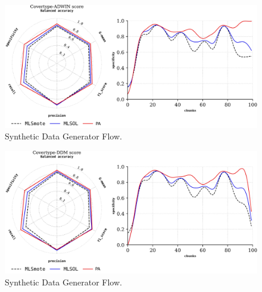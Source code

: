 \begin{figure}[!ht]
	\centering
	\includegraphics[width=1\linewidth]{4_Taxonomy/figures/exp_1.png}
	\caption{Synthetic Data Generator Flow.}
	\label{fig:4_first_proposal_result_exp_1}
\end{figure}

\begin{figure}[!ht]
	\centering
	\includegraphics[width=1\linewidth]{4_Taxonomy/figures/exp_2.png}
	\caption{Synthetic Data Generator Flow.}
	\label{fig:4_first_proposal_result_exp_2}
\end{figure}

